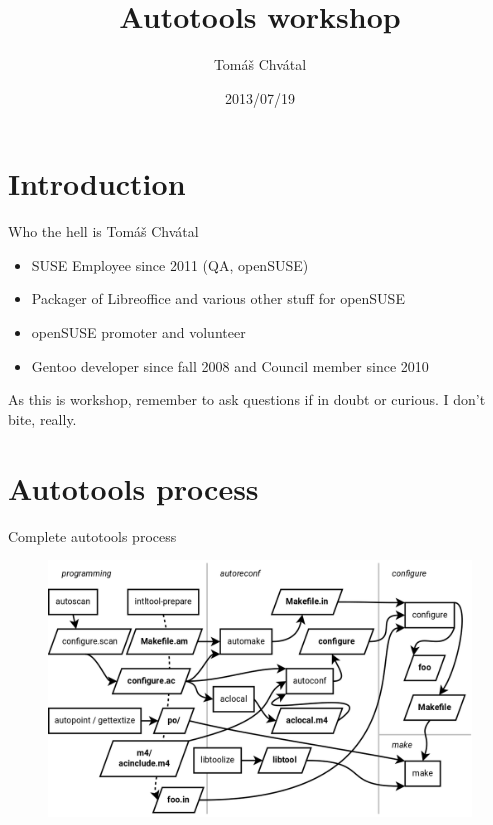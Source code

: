 \documentclass{beamer}
\author{Tom\'{a}\v{s} Chv\'{a}tal\newline {\small openSUSE Team}}
\title{Autotools workshop}
\date{2013/07/19}
\begin{document}
\begin{frame}[t,plain]
\titlepage
\end{frame}

\section{Introduction}

\begin{frame}[t]{Who the hell is Tomáš Chvátal}
	\begin{itemize}
	\item SUSE Employee since 2011 (QA, openSUSE)
	\item Packager of Libreoffice and various other stuff for openSUSE
	\item openSUSE promoter and volunteer
	\item Gentoo developer since fall 2008 and Council member since 2010
	\end{itemize}
	\begin{center}As this is workshop, remember to ask questions if in doubt or curious. I don't bite, really.\end{center}
\end{frame}

\section{Autotools process}

\begin{frame}{Complete autotools process}
	\begin{figure}
	\includegraphics[width= 1.0\linewidth]{autotools.png}
	\end{figure}
\end{frame}
\end{document}
